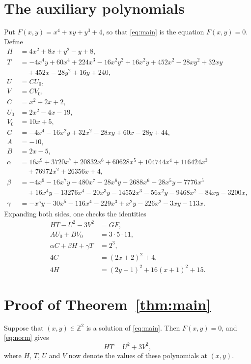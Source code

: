 \documentclass[11pt]{article}
\newcommand{\Z}{\mathbb{Z}}
\begin{document}
\section{The auxiliary polynomials}

Put $F(x,y)=x^{4}+xy+y^{3}+4$, so that \eqref{eq:main} is the equation $F(x,y)=0$. Define
\begin{align*}
H&=4x^{2}+8x+y^{2}-y+8,\\
T&=-4x^{4}y+60x^{4}+224x^{3}-16x^{2}y^{2}+16x^{2}y+452x^{2}-28xy^{2}+32xy\\
&\quad+452x-28y^{2}+16y+240,\\
U&=CU_0,\\
V&=CV_0,\\
C&=x^{2}+2x+2,\\
U_0&=2x^{2}-4x-19,\\
V_0&=10x+5,\\
G&=-4x^{4}-16x^{2}y+32x^{2}-28xy+60x-28y+44,\\
A&=-10,\\
B&=2x-5,\\
\alpha&=16x^{9}+3720x^{7}+20832x^{6}+60628x^{5}+104744x^{4}+116424x^{3}\\
&\quad+76972x^{2}+26356x+4,\\
\beta&=-4x^{9}-16x^{7}y-480x^{7}-28x^{6}y-2688x^{6}-28x^{5}y-7776x^{5}\\
&\quad+16x^{4}y-13276x^{4}-20x^{3}y-14552x^{3}-56x^{2}y-9468x^{2}-84xy-3200x,\\
\gamma&=-x^{5}y-30x^{5}-116x^{4}-229x^{3}+x^{2}y-226x^{2}-3xy-113x.
\end{align*}
Expanding both sides, one checks the identities
\begin{align}
HT-U^2-3V^2&=GF,\label{eq:norm}\\
AU_0+BV_0&=3\cdot 5\cdot 11,\label{eq:bezout}\\
\alpha C+\beta H+\gamma T&=2^{3},\label{eq:bezoutC}\\
4C&=(2x+2)^2+4,\label{eq:Cpos}\\
4H&=(2y-1)^2+16(x+1)^2+15.\label{eq:sign}
\end{align}

\section{Proof of Theorem~\ref{thm:main}}

Suppose that $(x,y)\in\Z^2$ is a solution of \eqref{eq:main}. Then $F(x,y)=0$, and \eqref{eq:norm} gives
\begin{equation}\label{eq:HT}
HT=U^2+3V^2,
\end{equation}
where $H$, $T$, $U$ and $V$ now denote the values of these polynomials at $(x,y)$.
\end{document}
